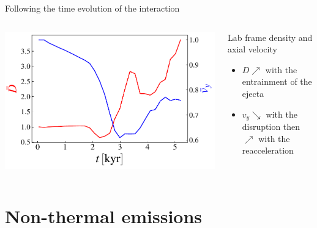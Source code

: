 \begin{frame}{Following the time evolution of the interaction}
\begin{columns}
\begin{column}{.5\textwidth}
      \includegraphics[width=\linewidth]{images/evolution_integrated_xz_d_vy_2_riot.pdf}
	   \end{column}
	   \begin{column}{.5\textwidth}
		{\footnotesize
		\begin{block}{Lab frame density and axial velocity}
			\begin{itemize}
				\item $D \nearrow$ with the entrainment of the ejecta
				\item $v_y \searrow$ with the disruption then $\nearrow$ with the reacceleration
			\end{itemize}
		\end{block}}
	   \end{column}
	\end{columns}
\end{frame}

\section{Non-thermal emissions}

